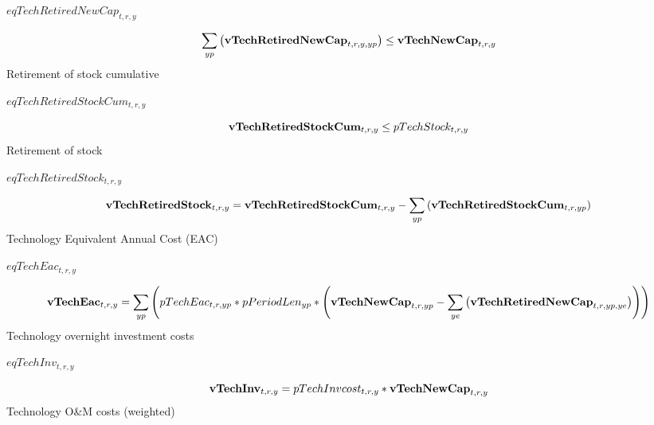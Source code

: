 \documentclass{article}
\begin{document}
$eqTechRetiredNewCap_{t,r,y}$





\begin{dmath} 
\sum_{yp}{\left({\bf vTechRetiredNewCap}_{t,r,y,yp}\right)}  \le  {\bf vTechNewCap}_{t,r,y}
\end{dmath} 
Retirement of stock cumulative







$eqTechRetiredStockCum_{t,r,y}$





\begin{dmath} 
{\bf vTechRetiredStockCum}_{t,r,y}  \le  pTechStock_{t,r,y}
\end{dmath} 
Retirement of stock







$eqTechRetiredStock_{t,r,y}$





\begin{dmath} 
{\bf vTechRetiredStock}_{t,r,y}  =  {\bf vTechRetiredStockCum}_{t,r,y}-\sum_{yp}{\left({\bf vTechRetiredStockCum}_{t,r,yp}\right)}
\end{dmath} 
Technology Equivalent Annual Cost (EAC)







$eqTechEac_{t,r,y}$





\begin{dmath} 
{\bf vTechEac}_{t,r,y}  =  \sum_{yp}{\left(pTechEac_{t,r,yp}*pPeriodLen_{yp}*\left({\bf vTechNewCap}_{t,r,yp}-\sum_{ye}{\left({\bf vTechRetiredNewCap}_{t,r,yp,ye}\right)}\right)\right)}
\end{dmath} 
Technology overnight investment costs







$eqTechInv_{t,r,y}$





\begin{dmath} 
{\bf vTechInv}_{t,r,y}  =  pTechInvcost_{t,r,y}*{\bf vTechNewCap}_{t,r,y}
\end{dmath} 
Technology O\&M costs (weighted)
\end{document}
